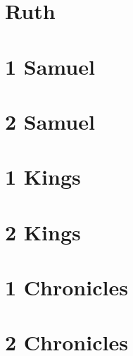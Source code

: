 \chapter{Ruth}
\begin{multicols}{2}
  \raggedcolumns
  \parskip=0pt \relax
  
\end{multicols}

\chapter{1 Samuel}
\begin{multicols}{2}
  \raggedcolumns
  \parskip=0pt \relax
  
\end{multicols}

\chapter{2 Samuel}
\begin{multicols}{2}
  \raggedcolumns
  \parskip=0pt \relax
  
\end{multicols}

\chapter{1 Kings}
\begin{multicols}{2}
  \raggedcolumns
  \parskip=0pt \relax
  
\end{multicols}

\chapter{2 Kings}
\begin{multicols}{2}
  \raggedcolumns
  \parskip=0pt \relax
  
\end{multicols}

\chapter{1 Chronicles}
\begin{multicols}{2}
  \raggedcolumns
  \parskip=0pt \relax
  
\end{multicols}

\chapter{2 Chronicles}
\begin{multicols}{2}
  \raggedcolumns
  \parskip=0pt \relax
  
\end{multicols}

